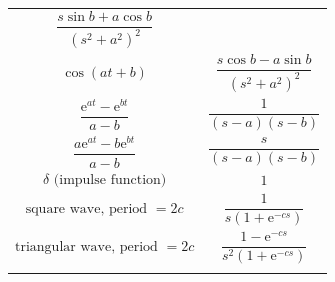 \documentclass[
]{book}
\begin{document}
\begin{longtable}[]{@{}ll@{}}
\begin{minipage}[t]{0.52\columnwidth}
\[\frac{s\sin{b} + a \cos{b}}{\left(s^2  + a^2\right)^2} \]\strut
\end{minipage}\tabularnewline
\begin{minipage}[t]{0.42\columnwidth}\raggedright
\[\cos \left(at + b\right)\]\strut
\end{minipage} & \begin{minipage}[t]{0.52\columnwidth}\raggedright
\[\frac{s\cos{b} - a \sin{b}}{\left(s^2  + a^2\right)^2} \]\strut
\end{minipage}\tabularnewline
\begin{minipage}[t]{0.42\columnwidth}\raggedright
\[\frac{\mathrm{e}^{at} - \mathrm{e}^{bt}}{a - b}\]\strut
\end{minipage} & \begin{minipage}[t]{0.52\columnwidth}\raggedright
\[\frac{1}{\left(s-a\right)\left(s-b\right)} \]\strut
\end{minipage}\tabularnewline
\begin{minipage}[t]{0.42\columnwidth}\raggedright
\[\frac{a\mathrm{e}^{at} - b\mathrm{e}^{bt}}{a - b}\]\strut
\end{minipage} & \begin{minipage}[t]{0.52\columnwidth}\raggedright
\[\frac{s}{\left(s-a\right)\left(s-b\right)} \]\strut
\end{minipage}\tabularnewline
\begin{minipage}[t]{0.42\columnwidth}\raggedright
\[\delta \text{ (impulse function)}\]\strut
\end{minipage} & \begin{minipage}[t]{0.52\columnwidth}\raggedright
\[1\]\strut
\end{minipage}\tabularnewline
\begin{minipage}[t]{0.42\columnwidth}\raggedright
\[\text{square wave, period }=2c\]\strut
\end{minipage} & \begin{minipage}[t]{0.52\columnwidth}\raggedright
\[\frac{1}{s \left( 1 + \mathrm{e}^{-cs} \right)} \]\strut
\end{minipage}\tabularnewline
\begin{minipage}[t]{0.42\columnwidth}\raggedright
\[\text{triangular wave, period }=2c\]\strut
\end{minipage} & \begin{minipage}[t]{0.52\columnwidth}\raggedright
\[\frac{1 - \mathrm{e}^{-cs}}{s^2 \left( 1 + \mathrm{e}^{-cs} \right)} \]\strut
\end{minipage}\tabularnewline
\begin{minipage}[t]{0.42\columnwidth}\raggedright

\end{minipage}
\end{longtable}
\end{document}
